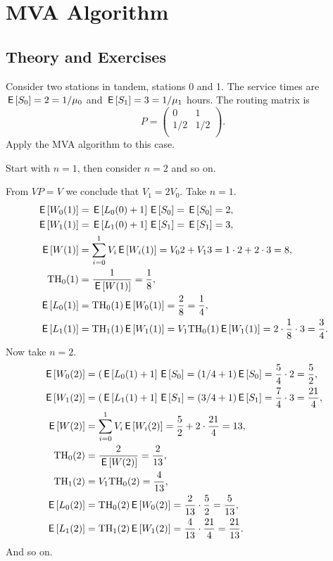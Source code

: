 
\section{MVA Algorithm}
\label{sec:mva}

\subsection*{Theory and Exercises}



\begin{exercise}\label{ex:mva_numerical}
  Consider two stations in tandem, stations 0 and 1. The service times
  are $\,\mathsf{E}\left[ S_0\right] = 2=1/\mu_0$ and $\,\mathsf{E}\left[ S_1\right] = 3=1/\mu_1$ hours. The routing matrix is
  \begin{equation*}
    P=
    \begin{pmatrix}
      0 & 1\\
1/2 & 1/2\\
    \end{pmatrix}.
  \end{equation*}
Apply the MVA algorithm to this case.
\begin{hint}
Start with $n=1$, then consider $n=2$ and so on.
\end{hint}
\begin{solution}
  From $V P = V$ we conclude that $V_1=2V_0$.  Take $n=1$.
  \begin{align*}
\,\mathsf{E}\left[ W_0(1)\right] &= \,\mathsf{E}\left[ L_0(0)+1\right]\,\mathsf{E}\left[ S_0\right] = \,\mathsf{E}\left[ S_0 \right]= 2,\\
 \,\mathsf{E}\left[ W_1(1)\right] &= \,\mathsf{E}\left[ L_1(0)+1\right]\,\mathsf{E}\left[ S_1\right] = \,\mathsf{E}\left[ S_1\right] = 3,\\
 \,\mathsf{E}\left[ W(1)\right] &= \sum_{i=0}^1 V_i \,\mathsf{E}\left[ W_i(1)\right] = V_0 2 + V_1  3 = 1\cdot 2 + 2 \cdot 3 = 8,\\
 \mathrm{TH}_0(1) &= \frac{1}{\,\mathsf{E}\left[ W(1)\right]} = \frac18, \\
 \,\mathsf{E}\left[ L_0(1)\right] &= \mathrm{TH}_0(1) \,\mathsf{E}\left[ W_0(1)\right] = \frac28=\frac14, \\
 \,\mathsf{E}\left[ L_1(1)\right] &= \mathrm{TH}_1(1) \,\mathsf{E}\left[ W_1(1)\right] = V_1 \mathrm{TH}_0(1) \,\mathsf{E}\left[ W_1(1)\right]= 2 \cdot \frac18 \cdot 3 = \frac34.\\
  \end{align*}
Now take $n=2$.     
  \begin{align*}
\,\mathsf{E}\left[ W_0(2) \right]&= (\,\mathsf{E}\left[ L_0(1)+1\right]\,\mathsf{E}\left[ S_0\right]= (1/4+1)\,\mathsf{E}\left[ S_0\right] = \frac54\cdot2=\frac52,\\
\,\mathsf{E}\left[ W_1(2) \right]&= (\,\mathsf{E}\left[ L_1(1)+1\right]\,\mathsf{E}\left[ S_1\right] = (3/4+1)\,\mathsf{E}\left[ S_1\right] = \frac74\cdot3=\frac{21}4,\\
\,\mathsf{E}\left[ W(2) \right]&= \sum_{i=0}^1 V_i \,\mathsf{E}\left[ W_i(2)\right] = \frac52 + 2 \cdot \frac{21}4=13,\\
\mathrm{TH}_0(2) &= \frac{2}{\,\mathsf{E}\left[ W(2)\right]} = \frac2{13}, \\
\mathrm{TH}_1(2) &= V_1 \mathrm{TH}_0(2) = \frac4{13}, \\
\,\mathsf{E}\left[ L_0(2)\right] &= \mathrm{TH}_0(2) \,\mathsf{E}\left[ W_0(2)\right] = \frac2{13}\cdot \frac52=\frac5{13}, \\
\,\mathsf{E}\left[ L_1(2)\right] &= \mathrm{TH}_1(2) \,\mathsf{E}\left[ W_1(2)\right] = \frac{4}{13} \cdot \frac{21}{4} = \frac{21}{13}.\\
  \end{align*}
And so on.
\end{solution}
\end{exercise}


